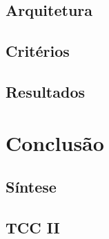 \documentclass{iiufrgs}
\begin{document}
\subsection{Arquitetura}
\subsection{Critérios}
\subsection{Resultados}
\section{Conclusão}
\subsection{Síntese}
\subsection{TCC II}
\end{document}
